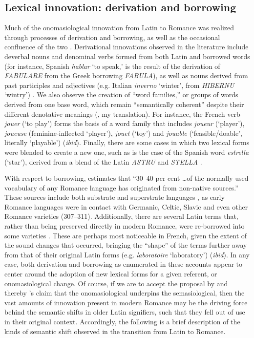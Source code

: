 \documentclass[output=paper,colorlinks,citecolor=brown,
]{langscibook}
\begin{document}
\subsection{Lexical innovation: derivation and borrowing}
Much of the onomasiological innovation from Latin to Romance was realized through processes of derivation and borrowing, as well as the occasional confluence of the two \citep[261]{glessgen_linguistique_2007}. Derivational innovations observed in the literature include deverbal nouns and denominal verbs formed from both Latin and borrowed words (for instance, Spanish \textit{hablar} ‘to speak,’ is the result of the derivation of \textit{FABULARE} from the Greek borrowing \textit{FABULA}), as well as nouns derived from past participles and adjectives (e.g. Italian \textit{inverno} ‘winter’, from \textit{HIBERNU} ‘wintry’) \citep[289--300]{alkire_romance_2010}. We also observe the creation of “word families,” or groups of words derived from one base word, which remain “semantically coherent” despite their different denotative meanings (\citealt[258]{glessgen_linguistique_2007}, my translation). For instance, the French verb \textit{jouer} (‘to play’) forms the basis of a word family that includes \textit{joueur} (‘player’), \textit{joueuse} (feminine-inflected ‘player’), \textit{jouet} (‘toy’) and \textit{jouable} (‘feasible/doable’, literally ‘playable’) (\textit{ibid}). Finally, there are some cases in which two lexical forms were blended to create a new one, such as is the case of the Spanish word \textit{estrella} (‘star’), derived from a blend of the Latin \textit{ASTRU} and \textit{STELLA} \citep[306]{alkire_romance_2010}.

With respect to borrowing, \citet[182]{posner_romance_1996} estimates that “30--40 per cent \dots of the normally used vocabulary of any Romance language has originated from non-native sources.” These sources include both substrate and superstrate languages \citep[287]{alkire_romance_2010}, as early Romance languages were in contact with Germanic, Celtic, Slavic and even other Romance varieties (307--311). Additionally, there are several Latin terms that, rather than being preserved directly in modern Romance, were re-borrowed into some varieties \citep[150]{posner_romance_1996}. These are perhaps most noticeable in French, given the extent of the sound changes that occurred, bringing the “shape” of the terms further away from that of their original Latin forms (e.g. \textit{laboratoire} ‘laboratory’) (\textit{ibid}). In any case, both derivation and borrowing as enumerated in these accounts appear to center around the adoption of new lexical forms for a given referent, or onomasiological change. Of course, if we are to accept the proposal by \cite{koch_pour_2002, koch_verbe_2002} and thereby \cite{dworkin_recent_2006}'s claim that the onomasiological underpins the semasiological, then the vast amounts of innovation present in modern Romance may be the driving force behind the semantic shifts in older Latin signifiers, such that they fell out of use in their original context. Accordingly, the following is a brief description of the kinds of semantic shift observed in the transition from Latin to Romance.
\end{document}
